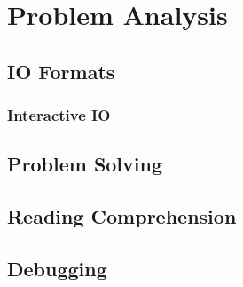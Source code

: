 \section{Problem Analysis}
\subsection{IO Formats}
\subsubsection{Interactive IO}
\subsection{Problem Solving}
\subsection{Reading Comprehension}
\subsection{Debugging}